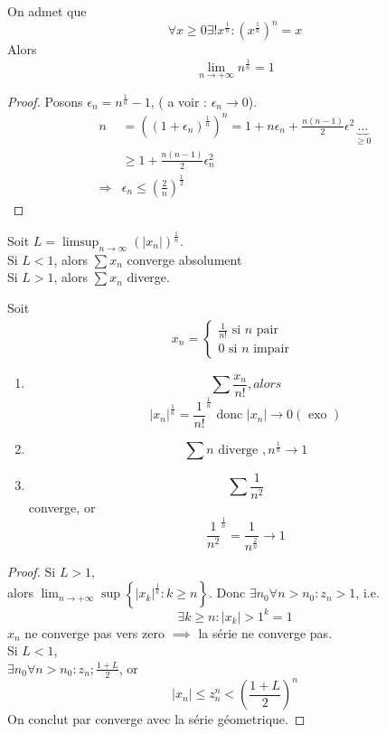 \documentclass[../main.tex]{subfiles}
\begin{document}
\begin{propo}
	On admet que 
	\[ 
		\forall x \geq 0 \exists ! x^{\frac{1}{n}}: ( x^{\frac{1}{n}})^{n} = x
	\]
	Alors
	\[ 
	\lim_{n \to  + \infty} n^{\frac{1}{n}} = 1
	\]
\end{propo}
\begin{proof}
	Posons $\epsilon_n = n^{\frac{1}{n}}-1$, ( a voir : $\epsilon_n \to 0$).
	\begin{align*}
		n &= ( (1 + \epsilon_n)^{\frac{1}{n}})^{n} = 1 + n \epsilon_n + \frac{n(n-1)}{2}\epsilon^{2} \underbrace{\ldots}_{\geq 0}\\
		  &\geq 1 + \frac{n(n-1)}{2}\epsilon_n^{2}\\
		\Rightarrow & \epsilon_n \leq \left( \frac{2}{n}\right)^{\frac{1}{2}}
	\end{align*}
	
\end{proof}
\begin{thm}\label{thm:critere_de_la_racine}
	Soit $L = \limsup_{n\to \infty} ( |x_n|)^{\frac{1}{n}}$.\\
	Si $L <1$, alors $\sum x_n$ converge absolument\\
	Si $L>1$, alors $ \sum x_n$ diverge.
\end{thm}
\begin{exemple}
Soit 
\begin{align*}
x_n = 
\begin{cases}
\frac{1}{n!} \text{ si $n$ pair } \\
0 \text{ si $n$ impair } 
\end{cases}
\end{align*}
\end{exemple}
\begin{exemple}
	\begin{enumerate}
	\item 
	
\[ 
	\sum \frac{x_n}{n!}, alors
\]
	\[ 
		|x_n|^{\frac{1}{n}}= \frac{1}{n!}^{\frac{1}{n}} \text{ donc } |x_n| \to 0 ( \text{ exo } )	
	\]
\item 
	\[ 
	\sum n \text{ diverge } , n^{\frac{1}{n}} \to 1
	\]
\item 
	\[ 
	\sum \frac{1}{n^{2}}
	\]
	converge, or
	\[ 
		\frac{1}{n^{2}}^{\frac{1}{n}} = \frac{1}{ n^{\frac{2}{n}}} \to 1
	\]
	
	\end{enumerate}
\end{exemple}
\begin{proof}
Si $L>1$,\\
alors $\lim_{n \to  + \infty} \sup \left\{ |x_k|^{\frac{1}{k}}: k \geq n \right\} $.
Donc $\exists n_0 \forall n > n_0: z_n >1$, i.e.
\[ 
	\exists k \geq n : |x_k| > 1^{k} =1
\]
$x_n$ ne converge pas vers zero $\implies$ la série ne converge pas.\\
Si $L <1$,\\
$\exists n_0 \forall n > n_0: z_n ; \frac{1+L}{2}$, or\\
\[ 
	|x_n| \leq z_n^{n}< \left( \frac{1+L}{2}\right)^{n}
\]
On conclut par converge avec la série géometrique.
\end{proof}
\end{document}
